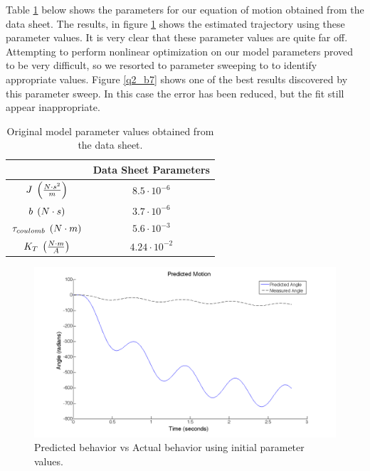 \documentclass{article}
\theoremstyle{plain}
\theoremstyle{definition}
\theoremstyle{remark}
\begin{document}
Table \ref{q2_b1} below shows the parameters for our equation of motion obtained from the data sheet.  The results, in figure \ref{q2_b2} shows the estimated trajectory using these parameter values.  It is very clear that these parameter values are quite far off.  Attempting to perform nonlinear optimization on our model parameters proved to be very difficult, so we resorted to parameter sweeping to to identify appropriate values.  Figure \ref{q2_b7} shows one of the best results discovered by this parameter sweep.  In this case the error has been reduced, but the fit still appear inappropriate.  \\

\begin{table}[htb]
\begin{center}
    \begin{tabular}{|c|c|}
        \hline
        ~                                                      & Data Sheet Parameters        \\ \hline
        $J \hspace{0.1cm} \left( \frac{N\cdot s^2}{m} \right)$     & $8.5 \cdot 10^{-6} $               \\ 
        $b \hspace{0.1cm} \left( N \cdot s \right) $               & $3.7\cdot 10^{-6} $                 \\ 
        $\tau_{coulomb} \hspace{0.1cm} \left( N \cdot m \right)$           & $5.6 \cdot 10^{-3}$  \\ 
        $K_{T} \hspace{0.1cm} \left( \frac{N\cdot m}{A} \right) $ & $4.24 \cdot 10^{-2}$             \\
        \hline
    \end{tabular}
\caption{Original model parameter values obtained from the data sheet.}
\label{q2_b1}
\end{center}
\end{table}

\begin{figure}[htb]
\begin{center}
\includegraphics[width = 14cm]{initialModel.png}
\caption{Predicted behavior vs Actual behavior using initial parameter values.}
\label{q2_b2}
\end{center}
\end{figure}
\end{document}
